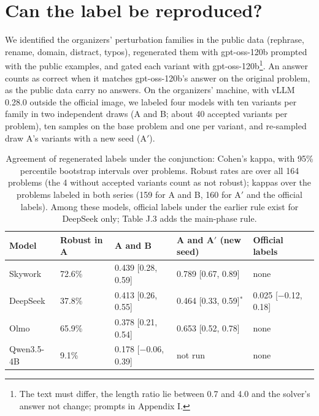 \documentclass{article}
\begin{document}
\section{Can the label be reproduced?}\label{sec:5}

We identified the organizers' perturbation families in the public data (rephrase, rename, domain, distract, typos), regenerated them with gpt-oss-120b prompted with the public examples, and gated each variant with gpt-oss-120b\footnote{The text must differ, the length ratio lie between 0.7 and 4.0 and the solver's answer not change; prompts in Appendix I.}. An answer counts as correct when it matches gpt-oss-120b's answer on the original problem, as the public data carry no answers. On the organizers' machine, with vLLM 0.28.0 outside the official image, we labeled four models with ten variants per family in two independent draws (A and B; about 40 accepted variants per problem), ten samples on the base problem and one per variant, and re-sampled draw A's variants with a new seed (A$'$).

\begin{table}[t]
\caption{Agreement of regenerated labels under the conjunction: Cohen's kappa, with 95\% percentile bootstrap intervals over problems. Robust rates are over all 164 problems (the 4 without accepted variants count as not robust); kappas over the problems labeled in both series (159 for A and B, 160 for A$'$ and the official labels). Among these models, official labels under the earlier rule exist for DeepSeek only; Table J.3 adds the main-phase rule.}
\label{tab:label}
\centering
\small
\setlength{\tabcolsep}{5pt}
\begin{tabular}{@{}lllll@{}}
\toprule
\textbf{Model} & \textbf{Robust in A} & \textbf{A and B} & \textbf{A and A$'$ (new seed)} & \textbf{Official labels} \\
\midrule
Skywork & 72.6\% & 0.439 [0.28, 0.59] & 0.789 [0.67, 0.89] & none \\
DeepSeek & 37.8\% & 0.413 [0.26, 0.55] & 0.464 [0.33, 0.59]$^{*}$ & 0.025 [$-$0.12, 0.18] \\
Olmo & 65.9\% & 0.378 [0.21, 0.54] & 0.653 [0.52, 0.78] & none \\
Qwen3.5-4B & 9.1\% & 0.178 [$-$0.06, 0.39] & not run & none \\
\bottomrule
\end{tabular}
\par{}
\end{table}
\end{document}
